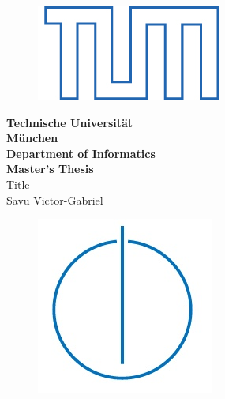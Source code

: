 \documentclass[]{article}
\begin{document}
\begin{titlepage}

\begin{center}
	\bigskip \bigskip \bigskip 
	\begin{figure}[ht]
		\centering \includegraphics[width=0.2\linewidth]{logo.png}
	\end{figure}
	\vspace*{0.8cm}
	{\huge \bf Technische Universität} \\
	\bigskip
	{\huge \bf München} \\
	\bigskip \bigskip \bigskip
	{\huge \bf Department of Informatics} \\
	\bigskip \bigskip \bigskip
	{\Large \bf Master's Thesis} \\
	\bigskip \bigskip \bigskip \bigskip \bigskip
	{\Large Title} \\        
	\bigskip \bigskip \bigskip \bigskip
	{\Large Savu Victor-Gabriel} \\    
	\bigskip
	\begin{figure}[ht]
		\centering \includegraphics[width=0.2\linewidth]{infologo.jpg}
	\end{figure}
	\bigskip 
\end{center}

\end{titlepage}
\end{document}
